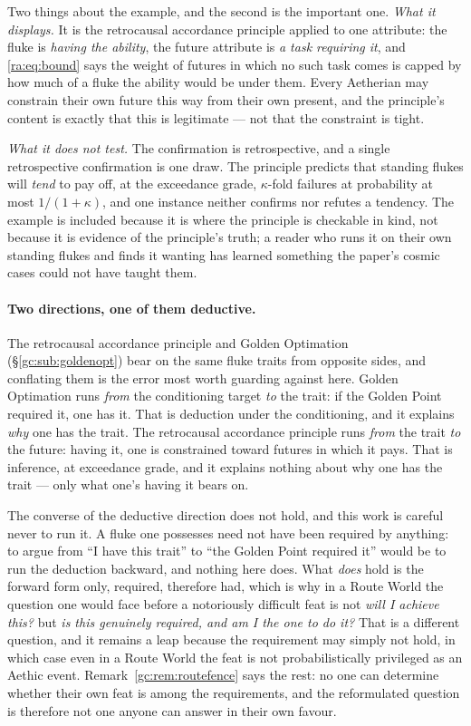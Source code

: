 \documentclass[11pt]{article}
\numberwithin{equation}{section}
\theoremstyle{plain}
\theoremstyle{definition}
\theoremstyle{remark}
\begin{document}
Two things about the example, and the second is the important one. \emph{What it displays.} It is the retrocausal accordance principle
applied to one attribute: the fluke is \emph{having the ability}, the
future attribute is \emph{a task requiring it}, and
\eqref{ra:eq:bound} says the weight of futures in which no such task
comes is capped by how much of a fluke the ability would be under them.
Every Aetherian may constrain their own future this way from their own
present, and the principle's content is exactly that this is legitimate
--- not that the constraint is tight.

\emph{What it does not test.} The confirmation is retrospective, and a
single retrospective confirmation is one draw. The principle predicts
that standing flukes will \emph{tend} to pay off, at the exceedance
grade, $\kappa$-fold failures at probability at most $1/(1+\kappa)$, and one instance neither confirms nor refutes a tendency. The
example is included because it is where the principle is checkable in
kind, not because it is evidence of the principle's truth; a reader who
runs it on their own standing flukes and finds it wanting has learned
something the paper's cosmic cases could not have taught them.

\paragraph{Two directions, one of them deductive.}\label{ra:rem:twodirs}
The retrocausal accordance principle and Golden Optimation
(\S\ref{gc:sub:goldenopt}) bear on the same fluke traits from opposite
sides, and conflating them is the error most worth guarding against here. Golden Optimation runs \emph{from} the conditioning target \emph{to} the
trait: if the Golden Point required it, one has it. That is deduction
under the conditioning, and it explains \emph{why} one has the trait.
The retrocausal accordance principle runs \emph{from} the trait \emph{to}
the future: having it, one is constrained toward futures in which it
pays. That is inference, at exceedance grade, and it explains nothing
about why one has the trait --- only what one's having it bears on.

The converse of the deductive direction does not hold, and this work is
careful never to run it. A fluke one possesses need not have been
required by anything: to argue from ``I have this trait'' to ``the Golden
Point required it'' would be to run the deduction backward, and nothing
here does. What \emph{does} hold is the forward form only, required,
therefore had, which is why in a Route World the question one would
face before a notoriously difficult feat is not \emph{will I achieve
this?} but \emph{is this genuinely required, and am I the one to do it?}
That is a different question, and it remains a leap because the
requirement may simply not hold, in which case even in a Route World the
feat is not probabilistically privileged as an Aethic event.
Remark~\ref{gc:rem:routefence} says the rest: no one can determine
whether their own feat is among the requirements, and the reformulated
question is therefore not one anyone can answer in their own favour.
\end{document}
